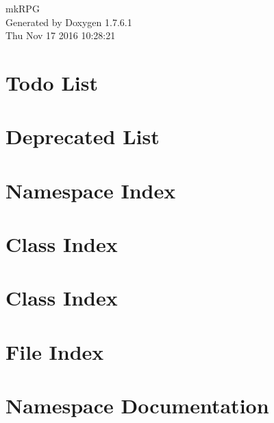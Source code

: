 \documentclass[a4paper]{book}
\begin{document}
\hypersetup{pageanchor=false,citecolor=blue}
\begin{titlepage}
\vspace*{7cm}
\begin{center}
{\Large mk\-R\-P\-G }\\
\vspace*{1cm}
{\large \-Generated by Doxygen 1.7.6.1}\\
\vspace*{0.5cm}
{\small Thu Nov 17 2016 10:28:21}\\
\end{center}
\end{titlepage}
\clearemptydoublepage
{}
\tableofcontents
\clearemptydoublepage
{}
\hypersetup{pageanchor=true,citecolor=blue}
\chapter{\-Todo \-List}
\label{todo}
\hypertarget{todo}{}

\chapter{\-Deprecated \-List}
\label{deprecated}
\hypertarget{deprecated}{}

\chapter{\-Namespace \-Index}

\chapter{\-Class \-Index}

\chapter{\-Class \-Index}

\chapter{\-File \-Index}

\chapter{\-Namespace \-Documentation}

\end{document}
